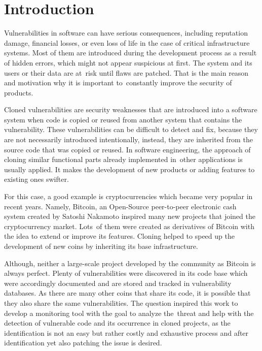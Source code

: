 
\chapter{Introduction}
  Vulnerabilities in software can have serious consequences, including reputation damage,
  financial losses, or even loss of life in the case of critical infrastructure systems. Most of them
  are introduced during the development process as a result of hidden errors, which might not appear
  suspicious at first. The system and its users or their data are at~risk until flaws are patched.
  That is the main reason and motivation why it is important to~constantly improve the security of products.

  Cloned vulnerabilities are security weaknesses that are introduced into a software system
  when code is copied or reused from another system that contains the vulnerability.
  These vulnerabilities can be difficult to detect and fix, because they are not necessarily introduced
  intentionally, instead, they are inherited from the source code that was copied or reused. In software
  engineering, the approach of cloning similar functional parts already implemented in~other applications
  is usually applied. It makes the development of new products or adding features to existing ones swifter.

  For this case, a good example is cryptocurrencies which became very popular in recent years.
  Namely, Bitcoin, an Open-Source peer-to-peer electronic cash system created by Satoshi Nakamoto
  \cite{bitcoin} inspired many new projects that joined the cryptocurrency market. Lots~of them were created
  as derivatives of Bitcoin with the idea to extend or improve its features. Cloning helped to speed up
  the development of new coins by inheriting its base infrastructure.

  Although, neither a large-scale project developed by the community as Bitcoin is always perfect. Plenty of
  vulnerabilities were discovered in its code base which were accordingly documented and are stored
  and tracked in vulnerability databases. As there are many other coins that share its code, it is possible
  that they also share the same vulnerabilities. The question inspired this work to develop a monitoring tool
  with the goal to analyze the~threat and help with the detection of vulnerable code and its occurrence in
  cloned projects, as the identification is not an easy but rather costly and exhaustive process
  and after identification yet also patching the issue is desired.


